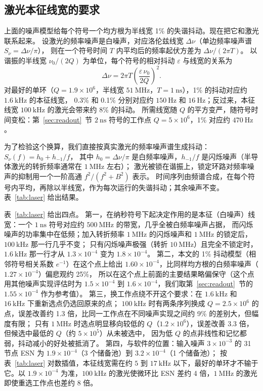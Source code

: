 \subsection{激光本征线宽的要求}\label{sec:laser}

上面的噪声模型给每个符号一个均方根为半线宽 1\% 的失谐抖动。现在把它和激光联系起来。
设激光的频率噪声是白噪声，对应洛伦兹线宽 $\Delta\nu$（单边频率噪声谱 $S_\nu=\Delta\nu/\pi$），
则在一个符号时间 $T$ 内平均后的频率起伏方差为 $\Delta\nu/(2\pi T)$。
以谐振的半线宽 $\nu_0/(2Q)$ 为单位，每个符号的相对抖动 $\varepsilon$ 与线宽的关系为
\begin{equation}
\Delta\nu=2\pi T\left(\frac{\varepsilon\,\nu_0}{2Q}\right)^{2}.
\label{eq:linewidth}
\end{equation}
对最好的单环（$Q=1.9\times10^{6}$，半线宽 $51~\mathrm{MHz}$，$T=1~\mathrm{ns}$），1\% 的抖动对应约 $1.6~\mathrm{kHz}$ 的本征线宽，
0.3\% 和 0.1\% 分别对应约 $150~\mathrm{Hz}$ 和 $16~\mathrm{Hz}$；反过来，本征线宽 $100~\mathrm{kHz}$ 的激光会带来约 8\% 的抖动。
所需线宽随 $Q$ 的平方变严，随符号时间变松：第~\ref{sec:readout}~节 $2~\mathrm{ns}$ 符号的工作点 $Q=5\times10^{6}$，1\% 对应约 $470~\mathrm{Hz}$。

为了检验这个换算，我们直接按真实激光的频率噪声谱生成抖动：$S_\nu(f)=h_0+h_{-1}/f$，
其中 $h_0=\Delta\nu/\pi$ 是白频率噪声，$h_{-1}/f$ 是闪烁噪声（半导体激光的转折频率通常在 $1~\mathrm{MHz}$ 左右）；
激光被锁在谐振上，锁定环路对频率噪声的抑制用一个一阶高通 $f^{2}/(f^{2}+B^{2})$ 表示。
时间序列由频谱合成，在每个符号内平均，再除以半线宽，作为每次运行的失谐抖动；其余噪声不变。
表~\ref{tab:laser} 给出结果。



表~\ref{tab:laser} 给出四点。
第一，在纳秒符号下起决定作用的是本征（白噪声）线宽：一个 $1~\mathrm{ns}$ 符号对应约 $500~\mathrm{MHz}$ 的带宽，几乎全被白频率噪声占据，
而闪烁噪声的功率集中在低频；加入转折频率 $1~\mathrm{MHz}$ 的闪烁噪声和 $1~\mathrm{MHz}$ 的锁定后，$100~\mathrm{kHz}$ 那一行几乎不变；
只有闪烁噪声极强（转折 $10~\mathrm{MHz}$）且完全不锁定时，$1.6~\mathrm{kHz}$ 那一行才从 $1.3\times10^{-4}$ 变为 $1.8\times10^{-4}$。
第二，本文的 1\% 抖动模型（相邻符号相关系数 $e^{-1}$）在这个点上给出 $1.60\times10^{-4}$，比同样均方根的白频率噪声（$1.27\times10^{-4}$）偏悲观约 25\%，
所以在这个点上前面的主要结果略偏保守（这个点用其他噪声实现评估时为 $1.5\times10^{-4}$ 到 $1.6\times10^{-4}$，我们取第~\ref{sec:readout}~节的 $1.55\times10^{-4}$ 作为参考值）。
第三，换工作点绕不开这个要求：在 $1.6~\mathrm{kHz}$ 和 $16~\mathrm{kHz}$ 下重新选点仍选回原来的点；
$100~\mathrm{kHz}$ 时有两条序列换成 $Q=2.5\times10^{6}$ 的点，误差改善约 1.3 倍，比同一工作点在不同噪声实现之间约 9\% 的差别大，但幅度有限；
只有 $1~\mathrm{MHz}$ 时选点明显移向较低的 $Q$（$1.2\times10^{6}$），误差改善 3.3 倍，但候选中最低的 $Q$（约 $5\times10^{5}$）从未被选中，
因为低 $Q$ 的点非线性和记忆都弱，抖动减小的好处被抵消了。
第四，与软件的位置：输入噪声 $3\times10^{-3}$ 的 31 节点 ESN 为 $1.9\times10^{-4}$（3 个储备池）到 $3.2\times10^{-4}$（1 个储备池）；
按表~\ref{tab:laser} 对数插值，本征线宽需在约 $5$ 到 $17~\mathrm{kHz}$ 以下，最好的单环才不输于它。以 $1.9\times10^{-4}$ 为准，$100~\mathrm{kHz}$ 的激光使微环比 ESN 差约 4 倍，$1~\mathrm{MHz}$ 的激光即使重选工作点也差约 8 倍。

